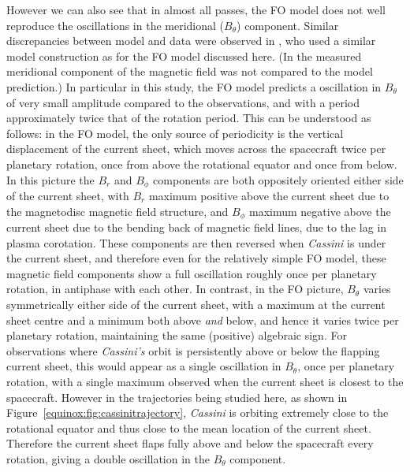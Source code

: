 However we can also see that in almost all passes, the FO model does not well reproduce the oscillations in the meridional ($B_{\theta}$) component. Similar discrepancies between model and data were observed in \citet{achilleos2014}, who used a similar model construction as for the FO model discussed here. (In \citet{arridge2011} the measured meridional component of the magnetic field was not compared to the model prediction.) In particular in this study, the FO model predicts a oscillation in $B_{\theta}$ of very small amplitude compared to the observations, and with a period approximately twice that of the rotation period. This can be understood as follows: in the FO model, the only source of periodicity is the vertical displacement of the current sheet, which moves across the spacecraft twice per planetary rotation, once from above the rotational equator and once from below. In this picture the $B_{r}$ and $B_{\phi}$ components are both oppositely oriented either side of the current sheet, with $B_{r}$ maximum positive above the current sheet due to the magnetodisc magnetic field structure, and $B_{\phi}$ maximum negative above the current sheet due to the bending back of magnetic field lines, due to the lag in plasma corotation. These components are then reversed when \textit{Cassini} is under the current sheet, and therefore even for the relatively simple FO model, these magnetic field components show a full oscillation roughly once per planetary rotation, in antiphase with each other. In contrast, in the FO picture, $B_{\theta}$ varies symmetrically either side of the current sheet, with a maximum at the current sheet centre and a minimum both above \textit{and} below, and hence it varies twice per planetary rotation, maintaining the same (positive) algebraic sign. For observations where \textit{Cassini's} orbit is persistently above or below the flapping current sheet, this would appear as a single oscillation in $B_{\theta}$, once per planetary rotation, with a single maximum observed when the current sheet is closest to the spacecraft. However in the trajectories being studied here, as shown in Figure~\ref{equinox:fig:cassinitrajectory}, \textit{Cassini} is orbiting extremely close to the rotational equator and thus close to the mean location of the current sheet. Therefore the current sheet flaps fully above and below the spacecraft every rotation, giving a double oscillation in the $B_{\theta}$ component.

